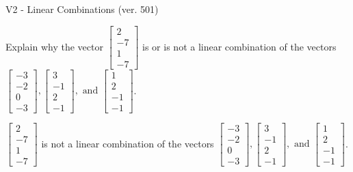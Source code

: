 \begin{exercise}
  \begin{exerciseTitle}V2 - Linear Combinations (ver. 501)\end{exerciseTitle}
  \begin{exerciseStatement}
    Explain why the vector \(\left[\begin{array}{c}
2 \\
-7 \\
1 \\
-7
\end{array}\right]\)  is or is not a linear 
	combination of the vectors \(\left[\begin{array}{c}
-3 \\
-2 \\
0 \\
-3
\end{array}\right] , \left[\begin{array}{c}
3 \\
-1 \\
2 \\
-1
\end{array}\right] , \text{ and } \left[\begin{array}{c}
1 \\
2 \\
-1 \\
-1
\end{array}\right]\).
	


  \end{exerciseStatement}
  \begin{exerciseAnswer}
   \(\left[\begin{array}{c}
2 \\
-7 \\
1 \\
-7
\end{array}\right]\) 
  	 is not  
	a linear combination of the vectors \(\left[\begin{array}{c}
-3 \\
-2 \\
0 \\
-3
\end{array}\right] , \left[\begin{array}{c}
3 \\
-1 \\
2 \\
-1
\end{array}\right] , \text{ and } \left[\begin{array}{c}
1 \\
2 \\
-1 \\
-1
\end{array}\right]\).

	
  


  \end{exerciseAnswer}
\end{exercise}
